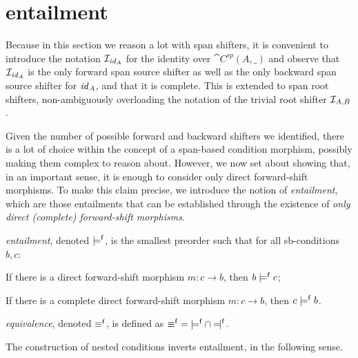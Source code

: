 \section{{\fprovable} entailment}

Because in this section we reason a lot with span shifters, it is convenient to introduce the notation $\mathcal{I}_{\mathit{id}_A}$ for the identity over  $\cat{C^{sp}}(A,\_)$ and observe that $\mathcal{I}_{\mathit{id}_A}$ is the only forward span source shifter as well as the only backward span source shifter for $\mathit{id}_A$, and that it is complete. This is extended to span root shifters, non-ambiguously overloading the notation of the trivial root shifter $\mathcal{I}_{A,B}$.

Given the number of possible forward and backward shifters we identified, there is a lot of choice within the concept of a span-based condition morphism, possibly making them complex to reason about. However, we now set about showing that, in an important sense, it is enough to consider only direct forward-shift morphisms. To make this claim precise, we introduce the notion of \emph{{\fprovable} entailment}, which are those entailments that can be established through the existence of \emph{only direct (complete) forward-shift morphisms}.

\begin{definition}\label{def:provable}
\emph{{\fprovable} entailment}, denoted $\models^{\mathsf f}$, is the smallest preorder such that for all sb-conditions $b,c$:
\begin{itemizeS}
\item If there is a direct forward-shift morphism $m:c\to b$, then $b\models^{\mathsf f} c$;
\item If there is a complete direct forward-shift morphism $m:c\to b$, then $c\models^{\mathsf f} b$.
\end{itemizeS}
\emph{{\fprovable} equivalence}, denoted $\equiv^{\mathsf f}$, is defined as ${\pequiv}={\pentails}\cap{\pentailedby}$.
\end{definition}
%
The construction of nested conditions inverts {\fprovable} entailment, in the following sense.

